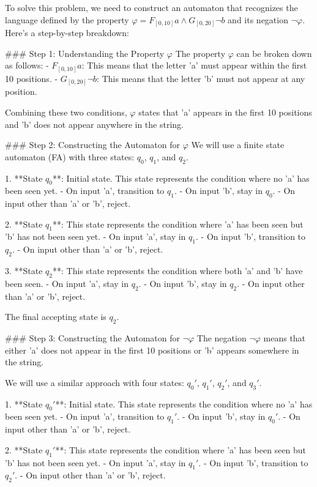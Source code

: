 To solve this problem, we need to construct an automaton that recognizes the language defined by the property \(\varphi = F_{[0,10]}a \land G_{[0,20]}\neg b\) and its negation \(\neg\varphi\). Here's a step-by-step breakdown:

### Step 1: Understanding the Property \(\varphi\)
The property \(\varphi\) can be broken down as follows:
- \(F_{[0,10]}a\): This means that the letter 'a' must appear within the first 10 positions.
- \(G_{[0,20]}\neg b\): This means that the letter 'b' must not appear at any position.

Combining these two conditions, \(\varphi\) states that 'a' appears in the first 10 positions and 'b' does not appear anywhere in the string.

### Step 2: Constructing the Automaton for \(\varphi\)
We will use a finite state automaton (FA) with three states: \(q_0\), \(q_1\), and \(q_2\).

1. **State \(q_0\)**: Initial state. This state represents the condition where no 'a' has been seen yet.
   - On input 'a', transition to \(q_1\).
   - On input 'b', stay in \(q_0\).
   - On input other than 'a' or 'b', reject.

2. **State \(q_1\)**: This state represents the condition where 'a' has been seen but 'b' has not been seen yet.
   - On input 'a', stay in \(q_1\).
   - On input 'b', transition to \(q_2\).
   - On input other than 'a' or 'b', reject.

3. **State \(q_2\)**: This state represents the condition where both 'a' and 'b' have been seen.
   - On input 'a', stay in \(q_2\).
   - On input 'b', stay in \(q_2\).
   - On input other than 'a' or 'b', reject.

The final accepting state is \(q_2\).

### Step 3: Constructing the Automaton for \(\neg\varphi\)
The negation \(\neg\varphi\) means that either 'a' does not appear in the first 10 positions or 'b' appears somewhere in the string.

We will use a similar approach with four states: \(q_0'\), \(q_1'\), \(q_2'\), and \(q_3'\).

1. **State \(q_0'\)**: Initial state. This state represents the condition where no 'a' has been seen yet.
   - On input 'a', transition to \(q_1'\).
   - On input 'b', stay in \(q_0'\).
   - On input other than 'a' or 'b', reject.

2. **State \(q_1'\)**: This state represents the condition where 'a' has been seen but 'b' has not been seen yet.
   - On input 'a', stay in \(q_1'\).
   - On input 'b', transition to \(q_2'\).
   - On input other than 'a' or 'b', reject.

